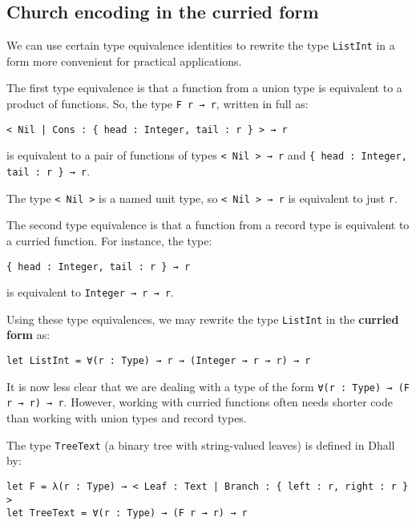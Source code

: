 \subsection{Church encoding in the curried form}


We can use certain type equivalence identities to rewrite the type \lstinline!ListInt! in a form more convenient for practical applications.


The first type equivalence is that a function from a union type is equivalent to a product of functions.
So, the type \lstinline!F r → r!, written in full as:


\begin{lstlisting}[language=Dhall]
< Nil | Cons : { head : Integer, tail : r } > → r
\end{lstlisting}


is equivalent to a pair of functions of types \lstinline!< Nil > → r! and \lstinline!{ head : Integer, tail : r } → r!.


The type \lstinline!< Nil >! is a named unit type, so \lstinline!< Nil > → r! is equivalent to just \lstinline!r!.


The second type equivalence is that a function from a record type is equivalent to a curried function.
For instance, the type:


\begin{lstlisting}[language=Dhall]
{ head : Integer, tail : r } → r
\end{lstlisting}


is equivalent to \lstinline!Integer → r → r!.


Using these type equivalences, we may rewrite the type \lstinline!ListInt! in the \textbf{curried form} as:


\begin{lstlisting}[language=Dhall]
let ListInt = ∀(r : Type) → r → (Integer → r → r) → r
\end{lstlisting}


It is now less clear that we are dealing with a type of the form \lstinline!∀(r : Type) → (F r → r) → r!.
However, working with curried functions often needs shorter code than working with union types and record types.


The type \lstinline!TreeText! (a binary tree with string-valued leaves) is defined in Dhall by:


\begin{lstlisting}[language=Dhall]
let F = λ(r : Type) → < Leaf : Text | Branch : { left : r, right : r } >
let TreeText = ∀(r : Type) → (F r → r) → r
\end{lstlisting}


